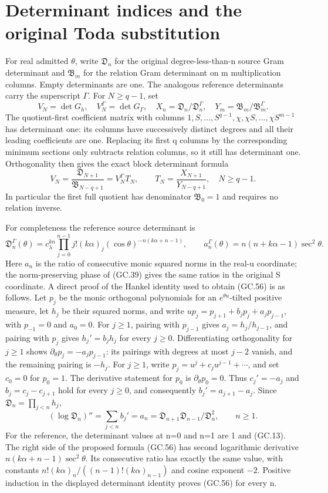 \documentclass[11pt]{article}
\begin{document}
\section{Determinant indices and the original Toda substitution}

For real admitted $\theta$, write $\mathfrak D_n$ for the original
degree-less-than-n source Gram determinant and $\mathfrak B_m$ for
the relation Gram determinant on m multiplication columns. Empty
determinants are one. The analogous reference determinants carry
the superscript $\Gamma$. For $N\ge q-1$, set
\[
 V_N=\det G_h,\quad V_N^\Gamma=\det G_\Gamma,
 \quad X_n=\mathfrak D_n/\mathfrak D_n^\Gamma,
 \quad Y_m=\mathfrak B_m/\mathfrak B_m^\Gamma.
\]
The quotient-first coefficient matrix with columns
$1,S,\ldots,S^{q-1},\chi,\chi S,\ldots,\chi S^{m-1}$
has determinant one: its columns have successively distinct degrees
and all their leading coefficients are one. Replacing its first q
columns by the corresponding minimum sections only subtracts
relation columns, so it still has determinant one. Orthogonality
then gives the exact block determinant formula
\[
 V_N=\frac{\mathfrak D_{N+1}}{\mathfrak B_{N-q+1}}
     =V_N^\Gamma T_N,\qquad
 T_N=\frac{X_{N+1}}{Y_{N-q+1}},\quad N\ge q-1.                  \tag{GC.55}
\]
In particular the first full quotient has denominator
$\mathfrak B_0=1$ and requires no relation inverse.

For completeness the reference source determinant is
\[
 \mathfrak D_n^\Gamma(\theta)=c_\lambda^{kn}
  \prod_{j=0}^{n-1}j!(k\alpha)_j
             (\cos\theta)^{-n(k\alpha+n-1)},
 \qquad
 a_n^\Gamma(\theta)=n(n+k\alpha-1)\sec^2\theta.                \tag{GC.56}
\]
Here $a_n$ is the ratio of consecutive monic squared norms in the
real-u coordinate; the norm-preserving phase of (GC.39) gives the
same ratios in the original S coordinate. A direct proof of the
Hankel identity used to obtain (GC.56) is as follows. Let $p_j$ be
the monic orthogonal polynomials for an $e^{\theta u}$-tilted
positive measure, let $h_j$ be their squared norms, and write
$up_j=p_{j+1}+b_jp_j+a_jp_{j-1}$, with $p_{-1}=0$ and $a_0=0$.
For $j\ge1$, pairing with $p_{j-1}$ gives
$a_j=h_j/h_{j-1}$, and pairing with $p_j$ gives $h_j'=b_jh_j$
for every $j\ge0$. Differentiating orthogonality for $j\ge1$ shows
$\partial_\theta p_j=-a_jp_{j-1}$: its pairings with degrees at
most $j-2$ vanish, and the remaining pairing is $-h_j$.
For $j\ge1$, write $p_j=u^j+c_ju^{j-1}+\cdots$, and set
$c_0=0$ for $p_0=1$. The derivative statement for $p_0$ is
$\partial_\theta p_0=0$. Thus $c_j'=-a_j$ and
$b_j=c_j-c_{j+1}$ hold for every $j\ge0$, and consequently
$b_j'=a_{j+1}-a_j$.
Since $\mathfrak D_n=\prod_{j<n}h_j$,
\[
 (\log\mathfrak D_n)''=\sum_{j<n}b_j'=a_n
   =\mathfrak D_{n+1}\mathfrak D_{n-1}/\mathfrak D_n^2,
   \qquad n\ge1.
\]
For the reference, the determinant values at n=0 and n=1 are 1
and (GC.13). The right side of the proposed formula (GC.56) has
second logarithmic derivative $n(k\alpha+n-1)\sec^2\theta$.
Its consecutive ratio has exactly the same value, with constants
$n!(k\alpha)_n/((n-1)!(k\alpha)_{n-1})$ and cosine exponent
$-2$. Positive induction in the displayed determinant identity
proves (GC.56) for every n.
\end{document}
